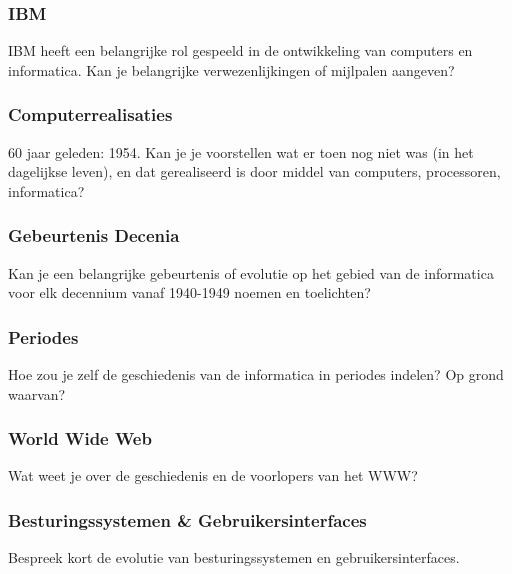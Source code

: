 \documentclass[../main.tex]{subfiles}
\begin{document}
\subsubsection{IBM}
\begin{question}
IBM heeft een belangrijke rol gespeeld in de ontwikkeling van computers en informatica. Kan je belangrijke verwezenlijkingen of mijlpalen aangeven?
\end{question}

\subsubsection{Computerrealisaties}
\begin{question}
60 jaar geleden: 1954. Kan je je voorstellen wat er toen nog niet was (in het dagelijkse leven), en dat gerealiseerd is door middel van computers, processoren, informatica?
\end{question}

\subsubsection{Gebeurtenis Decenia}
\begin{question}
Kan je een belangrijke gebeurtenis of evolutie op het gebied van de informatica voor elk decennium vanaf 1940-1949 noemen en toelichten?
\end{question}

\subsubsection{Periodes}
\begin{question}
Hoe zou je zelf de geschiedenis van de informatica in periodes indelen? Op grond waarvan?
\end{question}

\subsubsection{World Wide Web}
\begin{question}
Wat weet je over de geschiedenis en de voorlopers van het WWW?
\end{question}

\subsubsection{Besturingssystemen \& Gebruikersinterfaces}
\begin{question}
Bespreek kort de evolutie van besturingssystemen en gebruikersinterfaces.
\end{question}
\end{document}
